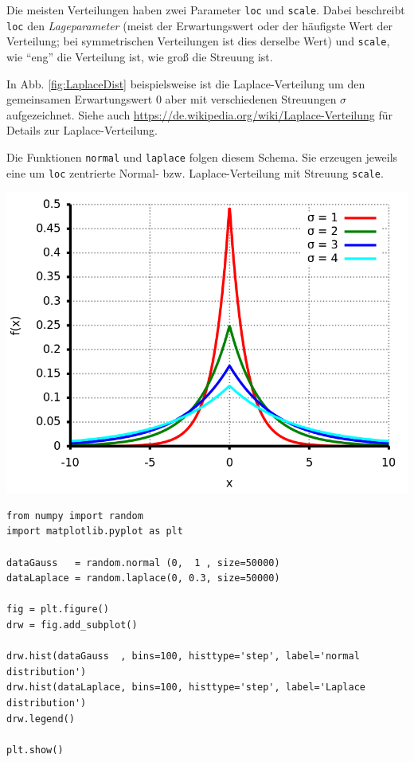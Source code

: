 \begin{minipage}[T]{.65\linewidth}
\setlength{\parskip}{\medskipamount}
Die meisten Verteilungen haben zwei Parameter \texttt{loc} und \texttt{scale}. Dabei beschreibt \texttt{loc} den \emph{Lageparameter} (meist der Erwartungswert oder der häufigste Wert der Verteilung; bei symmetrischen Verteilungen ist dies derselbe Wert) und \texttt{scale}, wie \enquote{eng} die Verteilung ist, \ie wie groß die Streuung ist.

In Abb. \ref{fig:LaplaceDist} beispielsweise ist die Laplace-Verteilung um den gemeinsamen Erwartungswert $0$ aber mit verschiedenen Streuungen $\sigma$ aufgezeichnet.
Siehe auch \url{https://de.wikipedia.org/wiki/Laplace-Verteilung} für Details zur Laplace-Verteilung.

Die Funktionen \texttt{normal} und \texttt{laplace} folgen diesem Schema. Sie erzeugen jeweils eine um \texttt{loc} zentrierte Normal- bzw. Laplace-Verteilung mit Streuung \texttt{scale}.
\end{minipage}
%
\hspace{1em}
%
\begin{minipage}[T]{.3\linewidth}
	\includegraphics[width=\linewidth]{./gfx/LaplaceDistribution}
	\label{fig:LaplaceDist}
\end{minipage}

\begin{codebox}
\begin{verbatim}
from numpy import random
import matplotlib.pyplot as plt

dataGauss   = random.normal (0,  1 , size=50000)
dataLaplace = random.laplace(0, 0.3, size=50000)

fig = plt.figure()
drw = fig.add_subplot()

drw.hist(dataGauss  , bins=100, histtype='step', label='normal distribution')
drw.hist(dataLaplace, bins=100, histtype='step', label='Laplace distribution')
drw.legend()

plt.show()
\end{verbatim}
\end{codebox}

